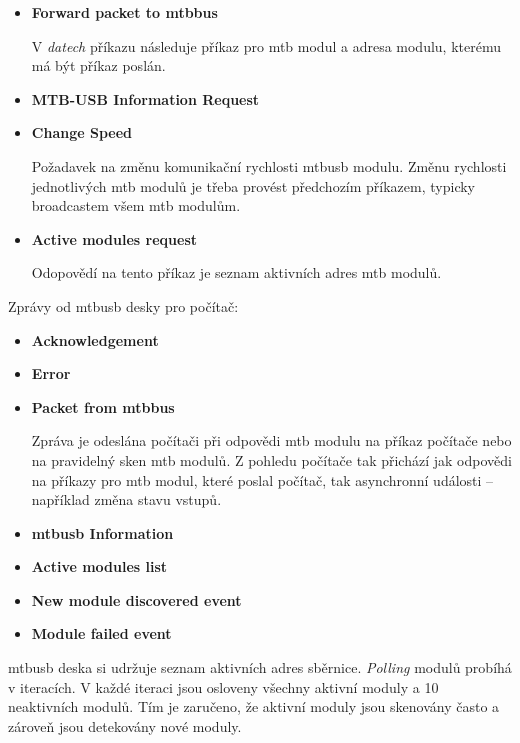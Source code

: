 \begin{itemize}
\item \textbf{Forward packet to \gls{mtbbus}}

V \textit{datech} příkazu následuje příkaz pro \gls{mtb} modul a adresa modulu,
kterému má být příkaz poslán.

\item \textbf{MTB-USB Information Request}

\item \textbf{Change Speed}

Požadavek na změnu komunikační rychlosti \gls{mtbusb} modulu. Změnu rychlosti
jednotlivých \gls{mtb} modulů je třeba provést předchozím příkazem, typicky
broadcastem všem \gls{mtb} modulům.

\item \textbf{Active modules request}

Odopovědí na tento příkaz je seznam aktivních adres \gls{mtb} modulů.
\end{itemize}

Zprávy od \gls{mtbusb} desky pro počítač:

\begin{itemize}
\item \textbf{Acknowledgement}
\item \textbf{Error}
\item \textbf{Packet from \gls{mtbbus}}

Zpráva je odeslána počítači při odpovědi \gls{mtb} modulu na příkaz počítače
nebo na pravidelný sken \gls{mtb} modulů. Z pohledu počítače tak přichází jak
odpovědi na příkazy pro \gls{mtb} modul, které poslal počítač, tak asynchronní
události – například změna stavu vstupů.

\item \textbf{\gls{mtbusb} Information}

\item \textbf{Active modules list}

\item \textbf{New module discovered event}

\item \textbf{Module failed event}

\end{itemize}

\gls{mtbusb} deska si udržuje seznam aktivních adres sběrnice. \textit{Polling}
modulů probíhá v iteracích. V každé iteraci jsou osloveny všechny aktivní
moduly a 10 neaktivních modulů. Tím je zaručeno, že aktivní moduly jsou
skenovány často a zároveň jsou detekovány nové moduly.

